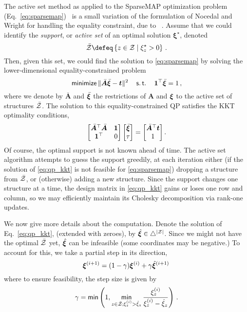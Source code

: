 The active set method
\citep[Chapters 16.4 \& 16.5]{nocedalwright} as applied to the SparseMAP
optimization problem (Eq.~\ref{eq:sparsemap})~\cite{niculae2018sparsemap}
is a small variation of the formulation of Nocedal and Wright for handling
the equality constraint, due to ~\citet[Section 6]{ad3}.
Assume that we could identify the \emph{support}, or
\emph{active set} of an optimal solution  $\bm{\xi}^\star$, denoted
\[\bar\ZZ \defeq \left\{z \in \ZZ \mid \xi^\star_z > 0\right\}\,. \]
Then, given this set, we could find the solution to \eqref{eq:sparsemap}
by solving the lower-dimensional equality-constrained problem
%
\begin{equation}
    \operatorname*{\mathsf{minimize}}\| \bar{\bm{A}}\bar{\bm{\xi}} - \bm{t} \|^2
    \quad\operatorname*{\mathsf{s.t.}}\quad\bm{1}^\top\bar{\bm{\xi}} = 1\,,
\end{equation}
%
where we denote by $\bar{\bm{A}}$ and $\bar{\bm{\xi}}$ the restrictions of $\bm{A}$
and $\bm{\xi}$ to the active set of structures $\bar{\mathcal{Z}}$.
The solution to this equality-constrained QP satisfies the KKT optimality
conditions,
%
\begin{equation}
    \label{eq:qp_kkt}
    \begin{bmatrix}
        {\bar{\bm{A}}}^\top \bar{\bm{A}} & \bm{1} \\
        \bm{1}^\top                      & 0      \\
    \end{bmatrix}
    \begin{bmatrix} \bar{\bm{\xi}} \\ \tau \end{bmatrix}
    =
    \begin{bmatrix} \bar{\bm{A}}^\top \bm{t} \\ 1 \end{bmatrix}.
\end{equation}
%
Of course, the optimal support is not known ahead of time. The active set
algorithm attempts to guess the support greedily,
at each iteration either (if the solution of \eqref{eq:qp_kkt} is not feasible
for \eqref{eq:sparsemap})
dropping a structure from $\bar{\mathcal{Z}}$, or (otherwise) adding a new structure.
Since the support changes one structure at a time, the design matrix in
\eqref{eq:qp_kkt} gains or loses one row and column, so
we may efficiently maintain its Cholesky decomposition via rank-one updates.

We now give more details about the computation.
Denote the solution of Eq.~\ref{eq:qp_kkt}, (extended with zeroes),
by $\hat{\bm{\xi}} \in \triangle^{|\mathcal{Z}|}$.
Since we might not have the optimal $\bar{\mathcal{Z}}$ yet, $\hat{\bm{\xi}}$ can be infeasible
(some coordinates may be negative.)
To account for this, we take a partial step in its direction,
%
\begin{equation}
    \bm{\xi}^{(i+1)} = (1-\gamma)\bm{\xi}^{(i)} + \gamma \hat{\bm{\xi}}^{(i+1)}\,
\end{equation}
%
where to ensure feasibility, the step size is given by
%
\begin{equation}\label{eq:step_size}
    \gamma = \operatorname*{\mathsf{min}} \left(1, \operatorname*{\mathsf{min}}_{z \in \bar{\mathcal{Z}}; \xi^{(i)}_z > \hat{\xi}_z}
    \frac{
        \xi^{(i)}_z
    }{
        \xi^{(i)}_z - \hat{\xi}_z}
    \right)\,.
\end{equation}

